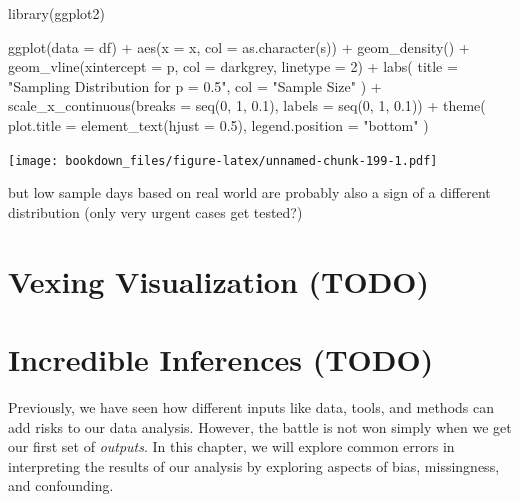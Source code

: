\documentclass[
]{krantz}
\makeatletter
\newenvironment{Shaded}{\begin{snugshade}}{\end{snugshade}}
\newcommand{\AttributeTok}[1]{\textcolor[rgb]{0.61,0.61,0.61}{#1}}
\newcommand{\DecValTok}[1]{\textcolor[rgb]{0.06,0.06,0.06}{#1}}
\newcommand{\FloatTok}[1]{\textcolor[rgb]{0.06,0.06,0.06}{#1}}
\newcommand{\FunctionTok}[1]{\textcolor[rgb]{0,0,0}{#1}}
\newcommand{\NormalTok}[1]{#1}
\newcommand{\SpecialCharTok}[1]{\textcolor[rgb]{0,0,0}{#1}}
\newcommand{\StringTok}[1]{\textcolor[rgb]{0.5,0.5,0.5}{#1}}
\newenvironment{kframe}{%
\medskip{}
\setlength{\fboxsep}{.8em}
 \def\at@end@of@kframe{}%
 \ifinner\ifhmode%
  \def\at@end@of@kframe{\end{minipage}}%
  \begin{minipage}{\columnwidth}%
 \fi\fi%
 \def\FrameCommand##1{\hskip\@totalleftmargin \hskip-\fboxsep
 \colorbox{shadecolor}{##1}\hskip-\fboxsep
     \hskip-\linewidth \hskip-\@totalleftmargin \hskip\columnwidth}%
 \MakeFramed {\advance\hsize-\width
   \@totalleftmargin\z@ \linewidth\hsize
   \@setminipage}}%
 {\par\unskip\endMakeFramed%
 \at@end@of@kframe}
\renewenvironment{Shaded}{\begin{kframe}}{\end{kframe}}
\makeatother
\begin{document}
\begin{Shaded}
\begin{Highlighting}[]
\FunctionTok{library}\NormalTok{(ggplot2)}

\FunctionTok{ggplot}\NormalTok{(}\AttributeTok{data =}\NormalTok{ df) }\SpecialCharTok{+}
  \FunctionTok{aes}\NormalTok{(}\AttributeTok{x =}\NormalTok{ x, }\AttributeTok{col =} \FunctionTok{as.character}\NormalTok{(s)) }\SpecialCharTok{+}
  \FunctionTok{geom\_density}\NormalTok{() }\SpecialCharTok{+}
  \FunctionTok{geom\_vline}\NormalTok{(}\AttributeTok{xintercept =}\NormalTok{ p, }\AttributeTok{col =} \StringTok{\textquotesingle{}darkgrey\textquotesingle{}}\NormalTok{, }\AttributeTok{linetype =} \DecValTok{2}\NormalTok{) }\SpecialCharTok{+}
  \FunctionTok{labs}\NormalTok{(}
    \AttributeTok{title =} \StringTok{"Sampling Distribution for p = 0.5"}\NormalTok{,}
    \AttributeTok{col =} \StringTok{"Sample Size"}
\NormalTok{  ) }\SpecialCharTok{+}
  \FunctionTok{scale\_x\_continuous}\NormalTok{(}\AttributeTok{breaks =} \FunctionTok{seq}\NormalTok{(}\DecValTok{0}\NormalTok{, }\DecValTok{1}\NormalTok{, }\FloatTok{0.1}\NormalTok{), }\AttributeTok{labels =} \FunctionTok{seq}\NormalTok{(}\DecValTok{0}\NormalTok{, }\DecValTok{1}\NormalTok{, }\FloatTok{0.1}\NormalTok{)) }\SpecialCharTok{+}
  \FunctionTok{theme}\NormalTok{(}
    \AttributeTok{plot.title =} \FunctionTok{element\_text}\NormalTok{(}\AttributeTok{hjust =} \FloatTok{0.5}\NormalTok{),}
    \AttributeTok{legend.position =} \StringTok{"bottom"}
\NormalTok{  )}
\end{Highlighting}
\end{Shaded}

\texttt{[image: bookdown\_files/figure-latex/unnamed-chunk-199-1.pdf]}

but low sample days based on real world are probably also a sign of a different distribution (only very urgent cases get tested?)

\hypertarget{vex-viz}{%
\chapter{Vexing Visualization (TODO)}\label{vex-viz}}

\hypertarget{incr-infe}{%
\chapter{Incredible Inferences (TODO)}\label{incr-infe}}

Previously, we have seen how different inputs like data, tools, and methods can add risks to our data analysis. However, the battle is not won simply when we get our first set of \emph{outputs}. In this chapter, we will explore common errors in interpreting the results of our analysis by exploring aspects of bias, missingness, and confounding.
\end{document}

